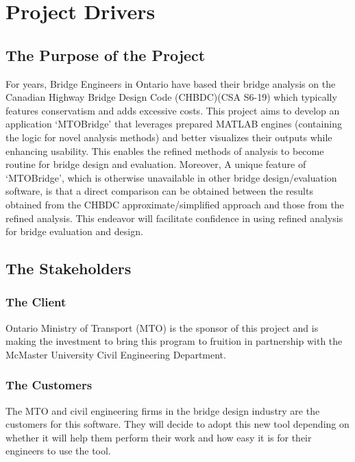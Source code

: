 \documentclass[12pt]{article}
\begin{document}
\begin{table}

\end{table}

\section{Project Drivers}

\subsection{The Purpose of the Project}
For years, Bridge Engineers in Ontario have based their bridge analysis on the Canadian Highway Bridge Design Code (CHBDC)(CSA S6-19) which typically features 
conservatism and adds excessive costs. This project aims to develop an application `MTOBridge' that leverages prepared MATLAB engines 
(containing the logic for novel analysis methods) and better visualizes their outputs while enhancing usability. This enables the refined methods of analysis to 
become routine for bridge design and evaluation. Moreover, A unique feature of `MTOBridge', which is otherwise unavailable in other bridge design/evaluation software, 
is that a direct comparison can be obtained between the results obtained from the CHBDC approximate/simplified approach and those from the refined analysis. 
This endeavor will facilitate confidence in using refined analysis for bridge evaluation and design.

\subsection{The Stakeholders}

\subsubsection{The Client}
Ontario Ministry of Transport (MTO) is the sponsor of this project and is making the investment to bring this program to fruition in 
partnership with the McMaster University Civil Engineering Department.
\subsubsection{The Customers}
The MTO and civil engineering firms in the bridge design industry are the customers for this software. They will 
decide to adopt this new tool depending on whether it will help them perform their work and how easy it is for their 
engineers to use the tool.
\end{document}
